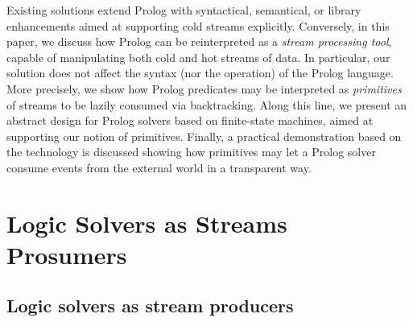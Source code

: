 \documentclass[12pt,a4paper,openright,twoside]{book}
\begin{document}
Existing solutions extend Prolog with syntactical, semantical, or library enhancements aimed at supporting cold streams explicitly.
%
Conversely, in this paper, we discuss how Prolog can be reinterpreted as a \emph{stream processing tool}, capable of manipulating both cold and hot streams of data.
%
In particular, our solution does not affect the syntax (nor the operation) of the Prolog language.
%
More precisely, we show how Prolog predicates may be interpreted as \emph{primitives} of streams to be lazily consumed via backtracking.
%
Along this line, we present an abstract design for Prolog solvers based on finite-state machines, aimed at supporting our notion of primitives.
%
Finally, a practical demonstration based on the \twopkt{} technology \cite{homepage2PKt} is discussed showing how primitives may let a Prolog solver consume events from the external world in a transparent way.


\section{Logic Solvers as Streams Prosumers}\label{sec:primitives}

\subsection{Logic solvers as stream producers}
\end{document}
